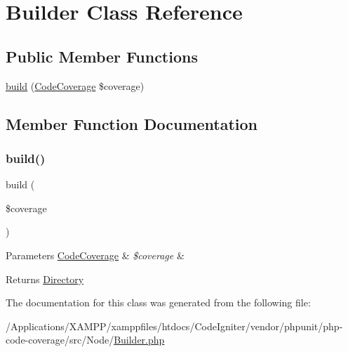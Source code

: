 \hypertarget{class_sebastian_bergmann_1_1_code_coverage_1_1_node_1_1_builder}{}\section{Builder Class Reference}
\label{class_sebastian_bergmann_1_1_code_coverage_1_1_node_1_1_builder}
\subsection*{Public Member Functions}
\begin{DoxyCompactItemize}
\item 
\mbox{\hyperlink{class_sebastian_bergmann_1_1_code_coverage_1_1_node_1_1_builder_ab69a5fbc02bb40434c8615c1518bb705}{build}} (\mbox{\hyperlink{class_sebastian_bergmann_1_1_code_coverage_1_1_code_coverage}{Code\+Coverage}} \$coverage)
\end{DoxyCompactItemize}


\subsection{Member Function Documentation}
\mbox{\label{class_sebastian_bergmann_1_1_code_coverage_1_1_node_1_1_builder_ab69a5fbc02bb40434c8615c1518bb705}} 
\subsubsection{\texorpdfstring{build()}{build()}}
{\footnotesize\ttfamily build (\begin{DoxyParamCaption}\item[{\mbox{\hyperlink{class_sebastian_bergmann_1_1_code_coverage_1_1_code_coverage}{Code\+Coverage}}}]{\$coverage }\end{DoxyParamCaption})}


\begin{DoxyParams}[1]{Parameters}
\mbox{\hyperlink{class_sebastian_bergmann_1_1_code_coverage_1_1_code_coverage}{Code\+Coverage}} & {\em \$coverage} & \\
\hline
\end{DoxyParams}
\begin{DoxyReturn}{Returns}
\mbox{\hyperlink{class_sebastian_bergmann_1_1_code_coverage_1_1_node_1_1_directory}{Directory}} 
\end{DoxyReturn}


The documentation for this class was generated from the following file\+:\begin{DoxyCompactItemize}
\item 
/\+Applications/\+X\+A\+M\+P\+P/xamppfiles/htdocs/\+Code\+Igniter/vendor/phpunit/php-\/code-\/coverage/src/\+Node/\mbox{\hyperlink{_builder_8php}{Builder.\+php}}\end{DoxyCompactItemize}

